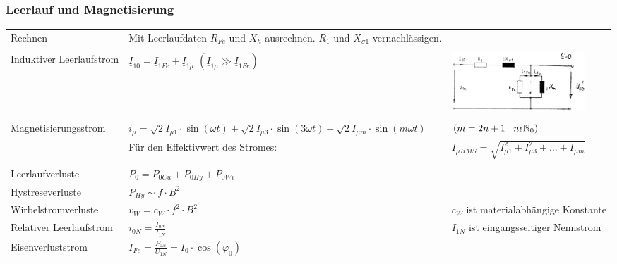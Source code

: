 		\subsubsection{Leerlauf und Magnetisierung}
			\begin{tabular}{p{5cm}p{6cm}p{7cm}}
            	Rechnen &
            		\begin{minipage}{13cm}
                    	Mit Leerlaufdaten $R_{Fe}$ und $X_h$ ausrechnen. $R_1$ und $X_{\sigma1}$ vernachl\"assigen.
                    \end{minipage} \\ \\
            	Induktiver Leerlaufstrom &
            		$\underline{I}_{10} = \underline{I}_{1Fe} + \underline{I}_{1\mu}$ $(\underline{I}_{1\mu} \gg \underline{I}_{1Fe})$ &
            		\begin{minipage}{8cm}
	            		\includegraphics[width=5cm]{bilder/ErsatzschaltbildTrafoLeerlauf.png}
	            	\end{minipage} \\ \\
				Magnetisierungsstrom &
					$i_\mu = \sqrt{2}I_{\mu1}\cdot \sin(\omega t) + \sqrt{2}I_{\mu3}\cdot \sin(3\omega t) + \sqrt{2}I_{\mu m}\cdot \sin(m\omega t)$ &
					\hspace{3.3cm}$(m=2n+1 \hspace{0.3cm} n\epsilon \mathbb{N}_0)$ \\
					&
					Für den Effektivwert des Stromes: &
					$I_{\mu RMS} = \sqrt{I_{\mu1}^2 + I_{\mu3}^2 +\ldots+ I_{\mu m}} $\\ \\
				Leerlaufverluste &
					$P_0 = P_{0Cu} + P_{0Hy} + P_{0Wi}$ \\
				Hystreseverluste &
					$P_{Hy} \sim f \cdot B^2$ \\
				Wirbelstromverluste &
					$v_W = c_W \cdot f^2 \cdot B^2$ &
					$c_W$ ist materialabh\"angige Konstante \\
				Relativer Leerlaufstrom &
					$i_{0N} = \frac{I_{0N}}{I_{1N}}$ &
					$I_{1N}$ ist eingangsseitiger Nennstrom \\
				Eisenverluststrom &
					$I_{Fe} = \frac{P_{0N}}{U_{1N}} = I_0 \cdot \cos(\varphi_0)$ \\

\end{tabular}
